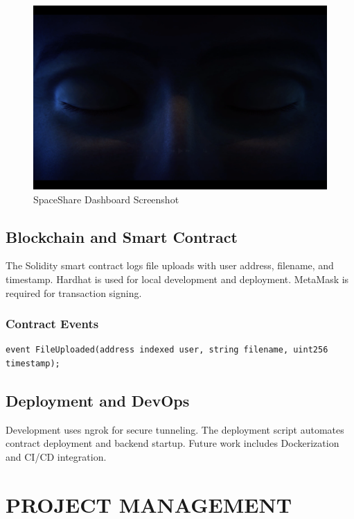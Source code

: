 \documentclass[a4paper, 12pt]{report}
\newenvironment{frontmatter}{}{}
\begin{document}
\begin{frontmatter}
\begin{figure}[H]
    \centering
    \includegraphics[width=0.7\linewidth]{./backend/static/img.png}
    \caption{SpaceShare Dashboard Screenshot}
\end{figure}

\section{Blockchain and Smart Contract}
The Solidity smart contract logs file uploads with user address, filename, and timestamp. Hardhat is used for local development and deployment. MetaMask is required for transaction signing.

\subsection{Contract Events}
\begin{lstlisting}[language=Solidity,caption={FileLog.sol Event}]
event FileUploaded(address indexed user, string filename, uint256 timestamp);
\end{lstlisting}

\section{Deployment and DevOps}
Development uses ngrok for secure tunneling. The deployment script automates contract deployment and backend startup. Future work includes Dockerization and CI/CD integration.

\chapter{PROJECT MANAGEMENT}

\end{frontmatter}
\end{document}
